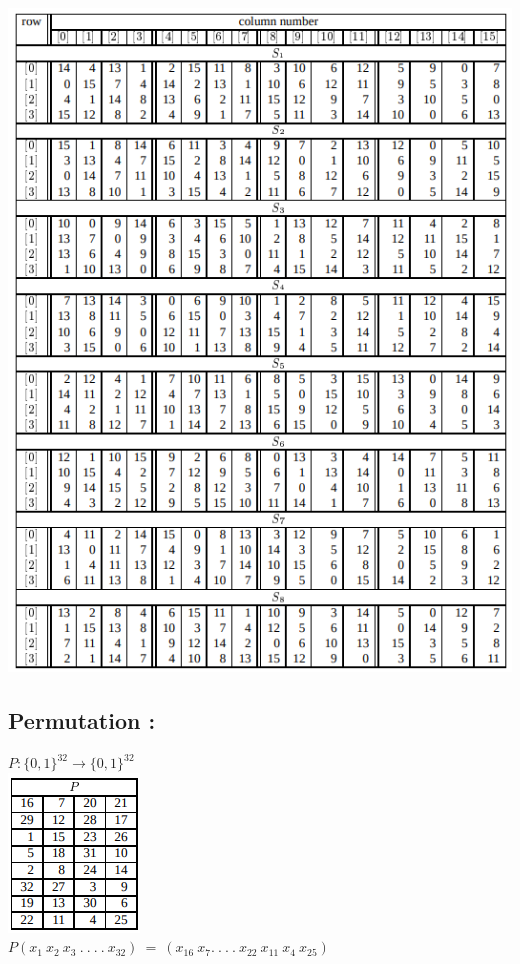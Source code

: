 \documentclass[11pt]{article}
\begin{document}
\includegraphics[scale=0.79]{Images/L_5-6/Des_Sbox.png}
\newpage

\subsection{Permutation :}

$P : \{0,1\}^{32} \rightarrow \{0,1\}^{32}$\\
\includegraphics[scale=1.5]{Images/L_5-6/Des_Permutation.png}\\
$P(x_1\ x_2\ x_3\ .\ .\ .\ .\ x_32)\ =\ (x_{16}\ x_{7} .\ .\ .\ .\ x_{22}\ x_{11}\ x_4\ x_{25})$
\end{document}
